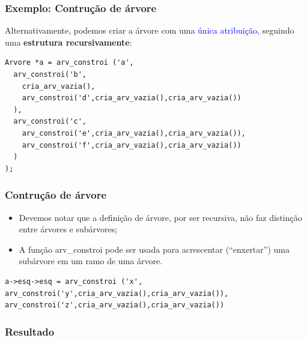 \documentclass{beamer}
\newcommand{\tcb}[1]{\textcolor{blue}{#1}}
\begin{document}
\begin{frame}[fragile]
  \frametitle{Exemplo: Contrução de árvore}

  Alternativamente, podemos criar a árvore com uma \tcb{única atribuição}, seguindo uma
  \textbf{estrutura recursivamente}:

  \begin{verbatim}
Arvore *a = arv_constroi ('a',
  arv_constroi('b',
    cria_arv_vazia(),
    arv_constroi('d',cria_arv_vazia(),cria_arv_vazia())
  ),
  arv_constroi('c',
    arv_constroi('e',cria_arv_vazia(),cria_arv_vazia()),
    arv_constroi('f',cria_arv_vazia(),cria_arv_vazia())
  )
);
  \end{verbatim}
\end{frame}

\begin{frame}[fragile]
  \frametitle{Contrução de árvore}

  \begin{itemize}
    \item Devemos notar que a definição de árvore, por ser recursiva, não faz distinção 
          entre árvores e subárvores;
    \item A função arv\_constroi pode ser usada para acrescentar (``enxertar'') uma subárvore 
          em um ramo de uma árvore.
  \end{itemize}

  \begin{verbatim}
a->esq->esq = arv_constroi ('x',
arv_constroi('y',cria_arv_vazia(),cria_arv_vazia()),
arv_constroi('z',cria_arv_vazia(),cria_arv_vazia())
  \end{verbatim}
\end{frame}

\begin{frame}[c]
  \frametitle{Resultado}

  \centering

\end{frame}
\end{document}
